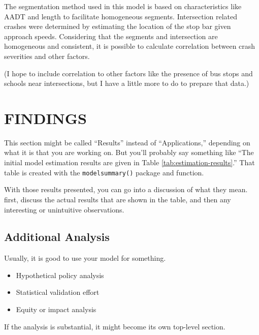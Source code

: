 \documentclass[3p, authoryear]{elsarticle} %
\providecommand{\tightlist}{%
  \setlength{\itemsep}{0pt}\setlength{\parskip}{0pt}}
\begin{document}
The segmentation method used in this model is based on characteristics like AADT and length to facilitate homogeneous segments. Intersection related crashes were determined by estimating the location of the stop bar given approach speeds. Considering that the segments and intersection are homogeneous and consistent, it is possible to calculate correlation between crash severities and other factors.

(I hope to include correlation to other factors like the presence of bus stops and schools near intersections, but I have a little more to do to prepare that data.)

\hypertarget{findings}{%
\section{FINDINGS}\label{findings}}

This section might be called ``Results'' instead of ``Applications,'' depending
on what it is that you are working on. But you'll probably say something like
``The initial model estimation results are given in Table \ref{tab:estimation-results}.''
That table is created with the \texttt{modelsummary()} package and function.

With those results presented, you can go into a discussion of what they mean.
first, discuss the actual results that are shown in the table, and then any
interesting or unintuitive observations.

\hypertarget{additional-analysis}{%
\subsection{Additional Analysis}\label{additional-analysis}}

Usually, it is good to use your model for something.

\begin{itemize}
\tightlist
\item
  Hypothetical policy analysis
\item
  Statistical validation effort
\item
  Equity or impact analysis
\end{itemize}

If the analysis is substantial, it might become its own top-level section.


\end{document}
